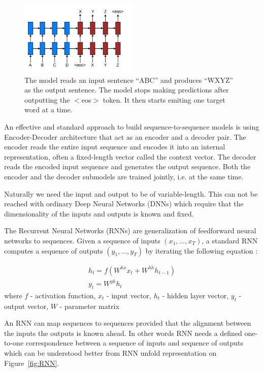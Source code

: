\begin{figure}[h]
	\centering
	\includegraphics[width=0.5\textwidth]{img/seq-to-seq.png}
	\caption{\label{fig:seq-to-seq}The model reads an input sentence “ABC” and produces “WXYZ” as the output 	sentence. The model stops making predictions after outputting the $<$eos$>$ token. It then starts 		 emiting one target word at a time. }
\end{figure}


An effective and standard approach to build sequence-to-sequence models is using Encoder-Decoder architecture that act as an encoder and a decoder pair. The encoder reads the entire input sequence and encodes it into an internal representation, often a fixed-length vector called the context vector. The decoder reads the encoded input sequence and generates the output sequence. Both the encoder and the decoder submodels are trained jointly, i.e. at the same time.

Naturally we need the input and output to be of variable-length. This can not be reached with ordinary Deep Neural Networks (DNNs) which require that the dimensionality of the inputs and outputs is known and fixed. 

The Recurrent Neural Networks (RNNs) are generalization of feedforward neural networks to sequences. Given a sequence of inputs $(x_1, ..., x_T)$, a standard RNN computes a
sequence of outputs $(y_1, ..., y_T)$ by iterating the following equation \cite{seq2seq_with_NN} :

\begin{equation}
\begin{array}{l}
	h_t = f(W^{hx}x_t + W^{hh}h_{t-1}) \\
	y_t = W^{yh}h_t
\end{array}
\end{equation}
where 
$f$ - activation function,
$x_{t}$ - input vector, 
$h_{t}$ - hidden layer vector,
$y_{t}$ - output vector,
$W$ - parameter matrix
 
 
An RNN can map sequences to sequences provided that the alignment between the inputs the
outputs is known ahead. In other words RNN needs a defined one-to-one correspondence between a sequence of inputs and sequence of outputs which can be understood better from RNN unfold representation on Figure~\ref{fig:RNN}.

